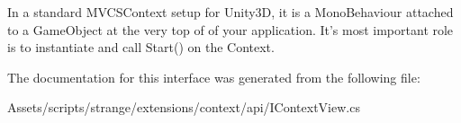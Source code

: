 In a standard M\-V\-C\-S\-Context setup for Unity3\-D, it is a Mono\-Behaviour attached to a Game\-Object at the very top of of your application. It's most important role is to instantiate and call {\ttfamily Start()} on the Context. 

The documentation for this interface was generated from the following file\-:\begin{DoxyCompactItemize}
\item 
Assets/scripts/strange/extensions/context/api/I\-Context\-View.\-cs\end{DoxyCompactItemize}
